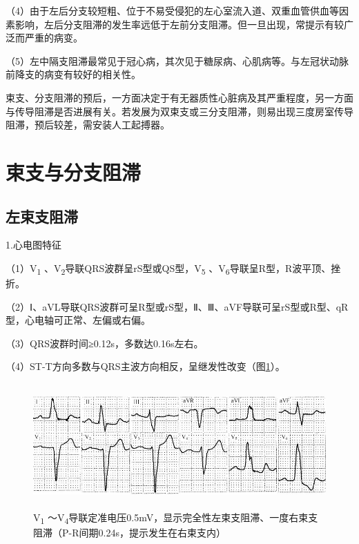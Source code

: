 （4）由于左后分支较短粗、位于不易受侵犯的左心室流入道、双重血管供血等因素影响，左后分支阻滞的发生率远低于左前分支阻滞。但一旦出现，常提示有较广泛而严重的病变。

（5）左中隔支阻滞最常见于冠心病，其次见于糖尿病、心肌病等。与左冠状动脉前降支的病变有较好的相关性。

束支、分支阻滞的预后，一方面决定于有无器质性心脏病及其严重程度，另一方面与传导阻滞是否进展有关。若发展为双束支或三分支阻滞，则易出现三度房室传导阻滞，预后较差，需安装人工起搏器。

\protect\hypertarget{text00028.htmlux5cux23subid343}{}{}

\section{束支与分支阻滞}

\protect\hypertarget{text00028.htmlux5cux23subid344}{}{}

\subsection{左束支阻滞}

1.心电图特征

（1）V\textsubscript{1} 、V\textsubscript{2}导联QRS波群呈rS型或QS型，V\textsubscript{5} 、V\textsubscript{6}导联呈R型，R波平顶、挫折。

（2）Ⅰ、aVL导联QRS波群可呈R型或rS型，Ⅱ、Ⅲ、aVF导联可呈rS型或R型、qR型，心电轴可正常、左偏或右偏。

（3）QRS波群时间≥0.12s，多数达0.16s左右。

（4）ST-T方向多数与QRS主波方向相反，呈继发性改变（图\ref{fig21-1}）。

\begin{figure}[!htbp]
 \centering
 \includegraphics[width=5.58333in,height=1.875in]{./images/Image00349.jpg}
 \captionsetup{justification=centering}
 \caption{V\textsubscript{1} ～V\textsubscript{4}导联定准电压0.5mV，显示完全性左束支阻滞、一度右束支阻滞（P-R间期0.24s，提示发生在右束支内）}
 \label{fig21-1}
  \end{figure} 


